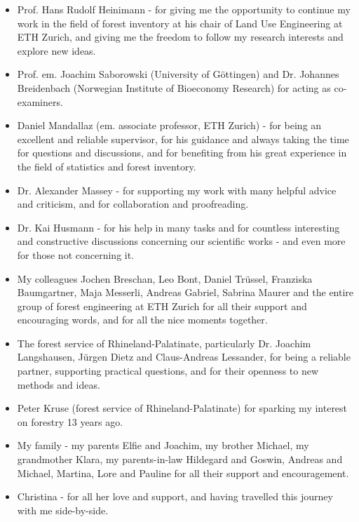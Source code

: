 \renewcommand{\labelitemi}{--}
\begin{itemize}
	\item Prof. Hans Rudolf Heinimann - for giving me the opportunity to continue my work in the field of forest inventory at his chair of Land Use Engineering at ETH Zurich, and giving me the freedom to follow my research interests and explore new ideas.
	
	\item Prof. em. Joachim Saborowski (University of G{\"o}ttingen) and Dr. Johannes Breidenbach (Norwegian Institute of Bioeconomy Research) for acting as co-examiners.
	
	\item Daniel Mandallaz (em. associate professor, ETH Zurich) - for being an excellent and reliable supervisor, for his guidance and always taking the time for questions and discussions, and for benefiting from his great experience in the field of statistics and forest inventory.
	
	\item Dr. Alexander Massey - for supporting my work with many helpful advice and criticism, and for collaboration and proofreading.
	
	\item Dr. Kai Husmann - for his help in many tasks and for countless interesting and constructive discussions concerning our scientific works - and even more for those not concerning it.
	
	\item My colleagues Jochen Breschan, Leo Bont, Daniel Tr{\"u}ssel, Franziska Baumgartner, Maja Messerli, Andreas Gabriel, Sabrina Maurer and the entire group of forest engineering at ETH Zurich for all their support and encouraging words, and for all the nice moments together.
	
	\item The forest service of Rhineland-Palatinate, particularly Dr. Joachim Langshausen, J{\"u}rgen Dietz and Claus-Andreas Lessander, for being a reliable partner, supporting practical questions, and for their openness to new methods and ideas.
	
	\item Peter Kruse (forest service of Rhineland-Palatinate) for sparking my interest on forestry 13 years ago.
	
	\item My family - my parents Elfie and Joachim, my brother Michael, my grandmother Klara, my parents-in-law Hildegard and Goswin, Andreas and Michael, Martina, Lore and Pauline for all their support and encouragement.
	
	\item Christina - for all her love and support, and having travelled this journey with me side-by-side.
	
\end{itemize}


\newpage
